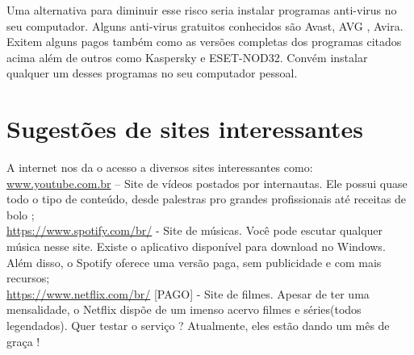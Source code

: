 \documentclass[hidelinks,12pt]{article}
\begin{document}
	Uma alternativa para diminuir esse risco seria instalar programas anti-virus no seu computador. Alguns anti-virus gratuitos conhecidos são Avast, AVG , Avira. Exitem alguns pagos também como as versões completas dos programas citados acima além de outros como Kaspersky e ESET-NOD32. Convém instalar qualquer um desses programas no seu computador pessoal.


	\section{Sugestões de sites interessantes}
		A internet nos da o acesso a diversos sites interessantes como:\\

		\url{www.youtube.com.br} – Site de vídeos postados por internautas. Ele possui quase todo o tipo de conteúdo, desde palestras pro grandes profissionais até receitas de bolo ;\\

		\url{https://www.spotify.com/br/} - Site de músicas. Você pode escutar qualquer música nesse site. Existe o aplicativo disponível para download no Windows. Além disso, o Spotify oferece uma versão paga, sem publicidade e com mais recursos;\\

		\url{https://www.netflix.com/br/} [PAGO] - Site de filmes. Apesar de ter uma mensalidade, o Netflix dispõe de um imenso acervo filmes e séries(todos legendados). Quer testar o serviço ? Atualmente, eles estão dando um mês de graça !
\end{document}
